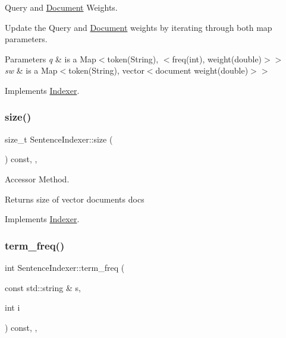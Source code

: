 Query and \hyperlink{class_document}{Document} Weights. 

Update the Query and \hyperlink{class_document}{Document} weights by iterating through both map parameters.


\begin{DoxyParams}{Parameters}
{\em q} & is a Map$<$token(\+String), $<$freq(int), weight(double)$>$$>$ \\
\hline
{\em sw} & is a Map$<$token(\+String), vector$<$document weight(double)$>$$>$ \\
\hline
\end{DoxyParams}


Implements \hyperlink{class_indexer_a74819336b6d9883483c09349ebdf43b8}{Indexer}.

\mbox{\label{class_sentence_indexer_a47409c62e1607ae3919a77080fe240a0}} 
\subsubsection{\texorpdfstring{size()}{size()}}
{\footnotesize\ttfamily size\+\_\+t Sentence\+Indexer\+::size (\begin{DoxyParamCaption}{ }\end{DoxyParamCaption}) const\hspace{0.3cm}{\ttfamily [inline]}, {\ttfamily [override]}, {\ttfamily [virtual]}}



Accessor Method. 

Returns size of vector documents docs 

Implements \hyperlink{class_indexer_ab8b3e17bbf16d54e1e773a1630abb138}{Indexer}.

\mbox{\label{class_sentence_indexer_a54f8bbbce9e37c355fe435b26c16f1ac}} 
\subsubsection{\texorpdfstring{term\+\_\+freq()}{term\_freq()}}
{\footnotesize\ttfamily int Sentence\+Indexer\+::term\+\_\+freq (\begin{DoxyParamCaption}\item[{const std\+::string \&}]{s,  }\item[{int}]{i }\end{DoxyParamCaption}) const\hspace{0.3cm}{\ttfamily [override]}, {\ttfamily [private]}, {\ttfamily [virtual]}}



